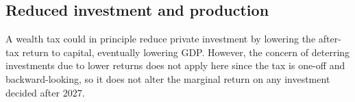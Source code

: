 \documentclass[../../main]{subfiles}
\begin{document}


\subsection{Reduced investment and production}\label{subsec:investment}

A wealth tax could in principle reduce private investment by lowering the after-tax return to capital, %
eventually lowering GDP. 
However, the concern of deterring investments due to lower returns does not apply here since the tax is one-off and backward-looking, so it does not alter the marginal return on any investment decided after 2027. %

\end{document}

